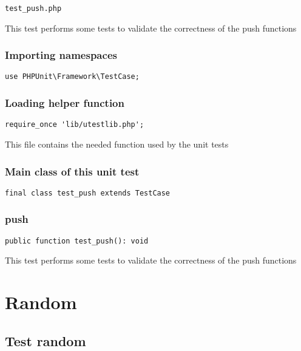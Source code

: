 \documentclass[a4paper]{article}
\begin{document}
\begin{lstlisting}
test_push.php
\end{lstlisting}

This test performs some tests to validate the correctness
of the push functions

\hypertarget{toc341}{}
\subsubsection{Importing namespaces}

\begin{lstlisting}
use PHPUnit\Framework\TestCase;
\end{lstlisting}

\hypertarget{toc342}{}
\subsubsection{Loading helper function}

\begin{lstlisting}
require_once 'lib/utestlib.php';
\end{lstlisting}

This file contains the needed function used by the unit tests

\hypertarget{toc343}{}
\subsubsection{Main class of this unit test}

\begin{lstlisting}
final class test_push extends TestCase
\end{lstlisting}

\hypertarget{toc344}{}
\subsubsection{push}

\begin{lstlisting}
public function test_push(): void
\end{lstlisting}

This test performs some tests to validate the correctness
of the push functions


\hypertarget{toc345}{}
\section{Random}

\hypertarget{toc346}{}
\subsection{Test random}
\end{document}
